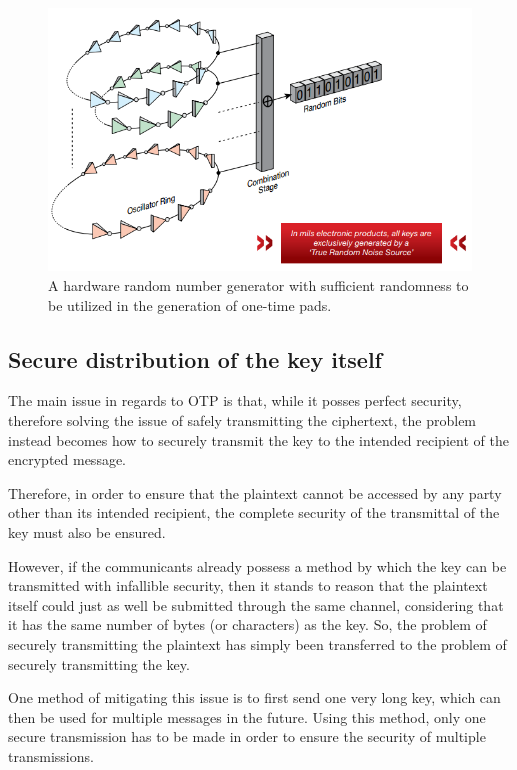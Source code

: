 \documentclass[12pt]{report}
\begin{document}
\begin{figure}[H]
\centering
\includegraphics[scale=0.75]{MilsElectronic.PNG}
\caption{A hardware random number generator with sufficient randomness to be utilized in the generation of one-time pads.}
\end{figure}

\subsection{Secure distribution of the key itself}
The main issue in regards to OTP is that, while it posses perfect security, therefore solving the issue of safely transmitting the ciphertext, the problem instead becomes how to securely transmit the key to the intended recipient of the encrypted message.

Therefore, in order to ensure that the plaintext cannot be accessed by any party other than its intended recipient, the complete security of the transmittal of the key must also be ensured.

However, if the communicants already possess a method by which the key can be transmitted with infallible security, then it stands to reason that the plaintext itself could just as well be submitted through the same channel, considering that it has the same number of bytes (or characters) as the key. So, the problem of securely transmitting the plaintext has simply been transferred to the problem of securely transmitting the key.

One method of mitigating this issue is to first send one very long key, which can then be used for multiple messages in the future. Using this method, only one secure transmission has to be made in order to ensure the security of multiple transmissions. 
\end{document}
